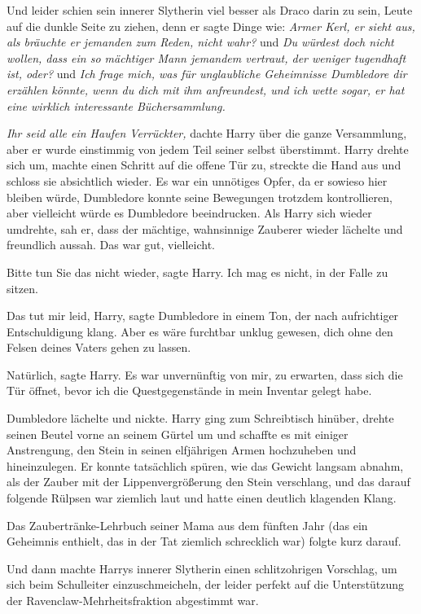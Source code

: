 Und leider schien sein innerer Slytherin viel besser als Draco darin zu sein,
Leute auf die dunkle Seite zu ziehen, denn er sagte Dinge wie: \glqq{}\emph{Armer
Kerl, er sieht aus, als bräuchte er jemanden zum Reden, nicht wahr?\grqq{}} und
\emph{\glqq{}Du würdest doch nicht wollen, dass ein so mächtiger Mann jemandem
vertraut, der weniger tugendhaft ist, oder?\grqq{}} und \emph{\glqq{}Ich frage
mich, was für unglaubliche Geheimnisse Dumbledore dir erzählen könnte, wenn du
dich mit ihm anfreundest, und ich wette sogar, er hat eine wirklich interessante
Büchersammlung.}

\emph{Ihr seid alle ein Haufen Verrückter,} dachte Harry über die ganze
Versammlung, aber er wurde einstimmig von jedem Teil seiner selbst überstimmt.
Harry drehte sich um, machte einen Schritt auf die offene Tür zu, streckte die
Hand aus und schloss sie absichtlich wieder. Es war ein unnötiges Opfer, da er
sowieso hier bleiben würde, Dumbledore konnte seine Bewegungen trotzdem
kontrollieren, aber vielleicht würde es Dumbledore beeindrucken. Als Harry sich
wieder umdrehte, sah er, dass der mächtige, wahnsinnige Zauberer wieder lächelte
und freundlich aussah. Das war gut, vielleicht.

\glqq{}Bitte tun Sie das nicht wieder\grqq{}, sagte Harry. \glqq{}Ich mag es
nicht, in der Falle zu sitzen.\grqq{}

\glqq{}Das tut mir leid, Harry\grqq{}, sagte Dumbledore in einem Ton, der nach
aufrichtiger Entschuldigung klang. \glqq{}Aber es wäre furchtbar unklug gewesen,
dich ohne den Felsen deines Vaters gehen zu lassen.\grqq{}

\glqq{}Natürlich\grqq{}, sagte Harry. \glqq{}Es war unvernünftig von mir, zu
erwarten, dass sich die Tür öffnet, bevor ich die Questgegenstände in mein
Inventar gelegt habe.\grqq{}

Dumbledore lächelte und nickte. Harry ging zum Schreibtisch hinüber, drehte
seinen Beutel vorne an seinem Gürtel um und schaffte es mit einiger Anstrengung,
den Stein in seinen elfjährigen Armen hochzuheben und hineinzulegen. Er konnte
tatsächlich spüren, wie das Gewicht langsam abnahm, als der Zauber mit der
Lippenvergrößerung den Stein verschlang, und das darauf folgende Rülpsen war
ziemlich laut und hatte einen deutlich klagenden Klang.

Das Zaubertränke-Lehrbuch seiner Mama aus dem fünften Jahr (das ein Geheimnis
enthielt, das in der Tat ziemlich schrecklich war) folgte kurz darauf.

Und dann machte Harrys innerer Slytherin einen schlitzohrigen Vorschlag, um sich
beim Schulleiter einzuschmeicheln, der leider perfekt auf die Unterstützung der
Ravenclaw-Mehrheitsfraktion abgestimmt war.

